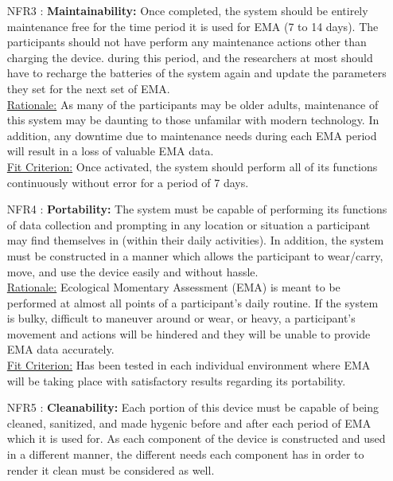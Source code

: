 \documentclass[12pt]{article}
\begin{document}
\begin{itemize}
\item[NFR3 \label{NFR3}:]
  \textbf{Maintainability:} Once completed, the system should be entirely maintenance free for the time period it is used for EMA (7 to 14 days). The participants should not have perform any maintenance actions other than charging the device. during this period, and the researchers at most should have to recharge the batteries of the system again and update the parameters they set for the next set of EMA.\\

\underline{Rationale:} As many of the participants may be older adults, maintenance of this system may be daunting to those unfamilar with modern technology. In addition, any downtime due to maintenance needs during each EMA period will result in a loss of valuable EMA data.\\

\underline{Fit Criterion:} Once activated, the system should perform all of its functions continuously without error for a period of 7 days.\\
\newpage
\item[NFR4 \label{NFR4}:]
  \textbf{Portability:} The system must be capable of performing its functions of data collection and prompting in any location or situation a participant may find themselves in (within their daily activities). In addition, the system must be constructed in a manner which allows the participant to wear/carry, move, and use the device easily and without hassle.\\

\underline{Rationale:} Ecological Momentary Assessment (EMA) is meant to be performed at almost all points of a participant's daily routine. If the system is bulky, difficult to maneuver around or wear, or heavy, a participant's movement and actions will be hindered and they will be unable to provide EMA data accurately.\\


\underline{Fit Criterion:} Has been tested in each individual environment where EMA will be taking place with satisfactory results regarding its portability.\\


\item[NFR5 \label{NFR5}:]
  \textbf{Cleanability:} Each portion of this device must be capable of being cleaned, sanitized, and made hygenic before and after each period of EMA which it is used for. As each component of the device is constructed and used in a different manner, the different needs each component has in order to render it clean must be considered as well.\\



\end{itemize}
\end{document}
